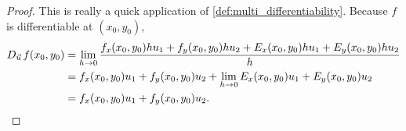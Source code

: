 \begin{proof}
This is really a quick application of \autoref{def:multi_differentiability}.  Because $f$ is differentiable at $(x_0,y_0)$,
\begin{align*}
 D_{\vec u\,}f(x_0,y_0)
 &=\lim_{h\to0}
 \frac{f_x(x_0,y_0)hu_1+f_y(x_0,y_0)hu_2+E_x(x_0,y_0)hu_1+E_y(x_0,y_0)hu_2}h \\
 &=f_x(x_0,y_0)u_1 + f_y(x_0,y_0)u_2+\lim_{h\to0}E_x(x_0,y_0)u_1+E_y(x_0,y_0)u_2 \\
 &=f_x(x_0,y_0)u_1 + f_y(x_0,y_0)u_2.\qedhere
\end{align*}
\end{proof}


